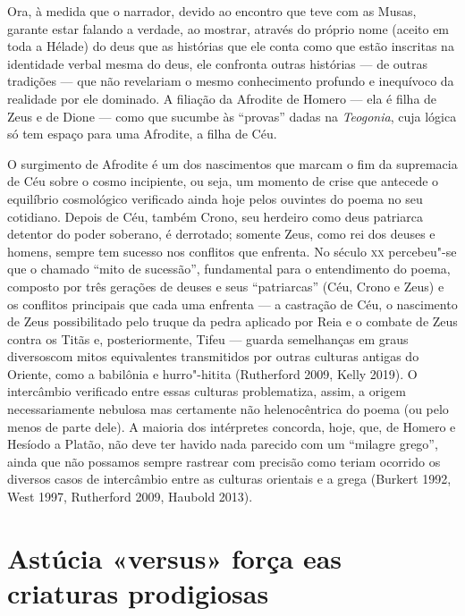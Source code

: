 Ora, à medida que o narrador, devido ao encontro que teve com as Musas,
garante estar falando a verdade, ao mostrar, através do próprio nome
(aceito em toda a Hélade) do deus que as histórias que ele conta como
que estão inscritas na identidade verbal mesma do deus, ele confronta
outras histórias --- de outras tradições --- que não revelariam o mesmo
conhecimento profundo e inequívoco da realidade por ele dominado. A
filiação da Afrodite de Homero --- ela é filha de Zeus e de Dione --- como
que sucumbe às ``provas'' dadas na \emph{Teogonia}, cuja lógica só tem
espaço para uma Afrodite, a filha de Céu.

O surgimento de Afrodite é um dos nascimentos que marcam o fim da
supremacia de Céu sobre o cosmo incipiente, ou seja, um momento de crise
que antecede o equilíbrio cosmológico verificado ainda hoje pelos
ouvintes do poema no seu cotidiano. Depois de Céu, também Crono, seu
herdeiro como deus patriarca detentor do poder soberano, é derrotado;
somente Zeus, como rei dos deuses e homens, sempre tem sucesso nos
conflitos que enfrenta. No século \textsc{xx} percebeu"-se que o chamado ``mito de
sucessão'', fundamental para o entendimento do poema, composto por três
gerações de deuses e seus ``patriarcas'' (Céu, Crono e Zeus) e os
conflitos principais que cada uma enfrenta --- a castração de Céu, o
nascimento de Zeus possibilitado pelo truque da pedra aplicado por Reia
e o combate de Zeus contra os Titãs e, posteriormente, Tifeu --- guarda
semelhanças em graus diversoscom mitos equivalentes transmitidos por
outras culturas antigas do Oriente, como a babilônia e hurro"-hitita
(Rutherford 2009, Kelly 2019). O intercâmbio verificado entre essas
culturas problematiza, assim, a origem necessariamente nebulosa mas
certamente não helenocêntrica do poema (ou pelo menos de parte dele). A
maioria dos intérpretes concorda, hoje, que, de Homero e Hesíodo a
Platão, não deve ter havido nada parecido com um ``milagre grego'',
ainda que não possamos sempre rastrear com precisão como teriam ocorrido
os diversos casos de intercâmbio entre as culturas orientais e a grega
(Burkert 1992, West 1997, Rutherford 2009, Haubold 2013).

\section[Astúcia «versus» força e as criaturas prodigiosas]{Astúcia «versus» força e\break as criaturas prodigiosas}


